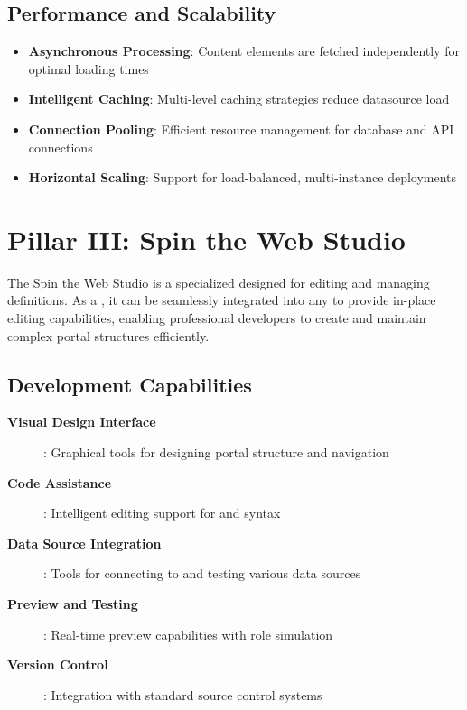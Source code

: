 \subsection{Performance and Scalability}

\begin{itemize}
    \item \textbf{Asynchronous Processing}: Content elements are fetched independently for optimal loading times
    \item \textbf{Intelligent Caching}: Multi-level caching strategies reduce datasource load
    \item \textbf{Connection Pooling}: Efficient resource management for database and API connections
    \item \textbf{Horizontal Scaling}: Support for load-balanced, multi-instance deployments
\end{itemize}

\section{Pillar III: Spin the Web Studio}
\label{sec:pillar-studio}

The Spin the Web Studio is a specialized \webbaselet{} designed for editing and managing \webbase{} definitions. As a \webbaselet{}, it can be seamlessly integrated into any \webbase{} to provide in-place editing capabilities, enabling professional developers to create and maintain complex portal structures efficiently.

\subsection{Development Capabilities}

\begin{description}
\item[\textbf{Visual Design Interface}]: Graphical tools for designing portal structure and navigation
\item[\textbf{Code Assistance}]: Intelligent editing support for \wbdl{} and \wbpl{} syntax
\item[\textbf{Data Source Integration}]: Tools for connecting to and testing various data sources
\item[\textbf{Preview and Testing}]: Real-time preview capabilities with role simulation
\item[\textbf{Version Control}]: Integration with standard source control systems
\end{description}

